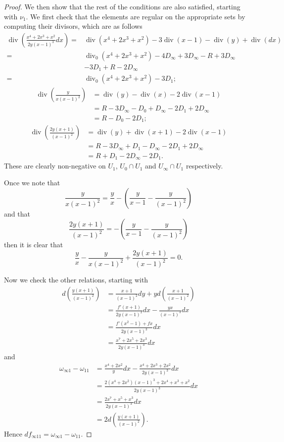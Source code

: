 \documentclass[draft, 11pt]{article} %
\theoremstyle{plain}
\theoremstyle{remark}
\DeclareMathOperator{\di}{div}
\begin{document}
\begin{proof}
We then show that the rest of the conditions are also satisfied, starting with $\nu_1$.
We first check that the elements are regular on the appropriate sets by computing their divisors, which are as follows
\begin{align*}
\di \left( \frac{x^4 + 2x^3 + x^2}{2y(x-1)^3}dx \right)  = & \di(x^4 + 2x^3 + x^2) -3\di(x-1) - \di(y) + \di(dx) \\
= &\di_0(x^4 + 2x^3 + x^2) - 4D_\infty + 3D_\infty  - R +3D_\infty\\
&  -3D_1 +R - 2D_\infty \\
= & \di_0(x^4 + 2x^3 + x^2) - 3D_1;
\end{align*}
\begin{align*}
\di \left(\frac{y}{x(x-1)^2} \right) & = \di(y) - \di(x) - 2\di(x-1) \\
& = R - 3D_\infty - D_0 + D_\infty - 2D_1 + 2D_\infty \\
& = R - D_0 - 2D_1;
\end{align*}
\begin{align*}
\di \left( \frac{2y(x+1)}{(x-1)^2} \right) & = \di(y) + \di(x+1) - 2\di(x-1) \\
& = R - 3D_\infty +D_1 - D_\infty - 2D_1 + 2D_\infty \\
& = R + D_1 - 2D_\infty - 2D_1.
\end{align*}
These are clearly non-negative on $U_1$, $U_0 \cap U_1$ and $U_\infty \cap U_1$ respectively.

Once we note that 
\[
\frac{y}{x(x-1)^2} = \frac{y}{x} -\left(\frac{y}{x-1} - \frac{y}{(x-1)^2} \right)
\]
and that
\[
\frac{2y(x+1)}{(x-1)^2} = -\left( \frac{y}{x-1} - \frac{y}{(x-1)^2}\right)
\]
then it is clear that
\[
\frac{y}{x} - \frac{y}{x(x-1)^2} + \frac{2y(x+1)}{(x-1)^2} = 0.
\]

Now we check the other relations, starting with
\begin{align*}
d \left( \frac{y(x+1)}{(x-1)^2} \right) & = \frac{x+1}{(x-1)^2}dy + y d \left( \frac{x+1}{(x-1)^2} \right) \\
& = \frac{f'(x+1)}{2y(x-1)^2}dx - \frac{yx}{(x-1)^3} dx \\
& = \frac{f'(x^2-1) +fx}{2y(x-1)^3}dx \\
& = \frac{x^7 + 2x^5 + 2x^3}{2y(x-1)^3}dx
\end{align*}
and
\begin{align*}
\omega_{\infty 1} - \omega_{11} & = \frac{x^4 + 2x^2}{y}dx - \frac{x^4 + 2x^3 + 2x^2}{2y(x-1)^3} dx \\
& = \frac{2(x^4 + 2x^2)(x-1)^3 + 2x^4 + x^3 + x^2}{2y(x-1)^3}dx \\
& = \frac{2x^7 + x^5 + x^3}{2y(x-1)^3}dx\\
& = 2d \left( \frac{y(x+1)}{(x-1)^2}\right).
\end{align*}
Hence $df_{\infty 1 1} = \omega_{\infty 1} - \omega_{1 1}$.


\end{proof}
\end{document}

